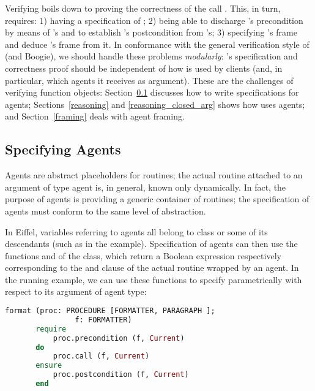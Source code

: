 Verifying  boils down to proving the
correctness of the call .  This, in turn, requires:
1) having a specification of ; 2) being able to
discharge 's precondition by means of
's and to establish
's postcondition from 's; 3)
specifying 's frame and deduce
's frame from it.  In conformance with the
general verification style of \AutoProof (and Boogie), we should handle these
problems \emph{modularly}: 's specification and
correctness proof should be independent of how  is
used by clients (and, in particular, which agents it receives as
argument).  These are the challenges of verifying function objects:
Section~\ref{specifying-func-ob} discusses how to write specifications
for agents; Sections~\ref{reasoning} and \ref{reasoning_closed_arg}
shows how \AutoProof uses agents; and Section~\ref{framing} deals with
agent framing.





\subsection{Specifying Agents}\label{specifying-func-ob}
Agents are abstract placeholders for routines; the actual routine attached to an argument of type agent is, in general, known only dynamically.
In fact, the purpose of agents is providing a generic container of routines; the specification of agents must conform to the same level of abstraction.

In Eiffel, variables referring to agents all belong to class  or some of its descendants (such as  in the  example). Specification of agents can then use the functions  and  of the class, which return a Boolean expression respectively corresponding to the  and  clause of the actual routine wrapped by an agent.
In the running example, we can use these functions to specify  parametrically with respect to its argument  of agent type:
\begin{lstlisting}[language=Eiffel, escapechar=\#]
     format (proc: PROCEDURE [FORMATTER, PARAGRAPH ]; 
                f: FORMATTER)
       require    
           proc.precondition (f, Current)
       do
           proc.call (f, Current)
       ensure
           proc.postcondition (f, Current)
       end
\end{lstlisting}

